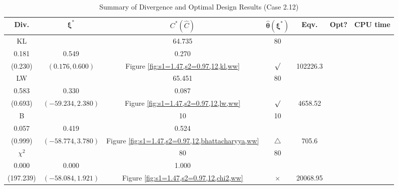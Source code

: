 \documentclass[12pt, a4paper]{article}
\begin{document}
\begin{table}[H]
\centering
\renewcommand{\arraystretch}{1.5} %
\setlength{\tabcolsep}{8pt} %
\begin{tabular}{|c|c|c|c|c|c|c|}
\hline
\textbf{Div.} & \(\boldsymbol{\xi^*}\) & \(C^* (\hat{C})\) & \(\boldsymbol{\hat{\theta}(\xi^*)}\) & \textbf{Eqv.} & \textbf{Opt?} & \textbf{CPU time} \\
\hline
KL & \(\left\{\begin{array}{ccc}
49.573 & 64.735 & 80 \\
0.181 & 0.549 & 0.270
\end{array}\right\}\) &
\(\begin{array}{c}
0.230 \\
(0.230)
\end{array}\) & 
\((0.176, 0.600)\) & 
Figure \ref{fig:s1=1.47,s2=0.97,12,kl,ww} & $\surd$ & 102226.3 \\
\hline
LW & \(\left\{\begin{array}{ccc}
62.798 & 65.451 & 80 \\
0.583 & 0.330 & 0.087
\end{array}\right\}\) &
\(\begin{array}{c}
0.0284 \\
(0.693)
\end{array}\) & 
\((-59.234, 2.380)\) & 
Figure \ref{fig:s1=1.47,s2=0.97,12,lw,ww} & $\surd$ & 4658.52 \\
\hline
B & \(\left\{\begin{array}{ccc}
10 & 10 & 10 \\
0.057 & 0.419 & 0.524
\end{array}\right\}\) &
\(\begin{array}{c}
0.999 \\
(0.999)
\end{array}\) & 
\((-58.774, 3.780)\) & 
Figure \ref{fig:s1=1.47,s2=0.97,12,bhattacharyya,ww} & $\triangle$ & 705.6 \\
\hline
\(\chi^2\) & \(\left\{\begin{array}{ccc}
80 & 80 & 80 \\
0.000 & 0.000 & 1.000
\end{array}\right\}\) &
\(\begin{array}{c}
197.506 \\
(197.239)
\end{array}\) & 
\((-58.084, 1.921)\) & 
Figure \ref{fig:s1=1.47,s2=0.97,12,chi2,ww} & $\times$ & 20068.95 \\
\hline
\end{tabular}
\caption{Summary of Divergence and Optimal Design Results (Case 2.12)}
\label{tab:results2.12}
\end{table}
\end{document}
